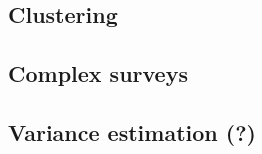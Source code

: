 \documentclass{article}
\begin{document}
\subsection{Clustering}

\subsection{Complex surveys}

\subsection{Variance estimation (?)}
\end{document}
